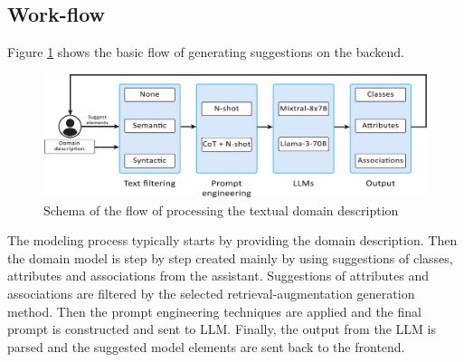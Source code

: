 \subsection{Work-flow}

Figure \ref{fig:work-flow} shows the basic flow of generating suggestions on the backend.

\begin{figure}[!h]
    \centering
    \includegraphics[scale=0.23]{img/work-flow.jpg}
    \caption{\centering Schema of the flow of processing the textual domain description}
    \label{fig:work-flow}
\end{figure}

The modeling process typically starts by providing the domain description. Then the domain model is step by step created mainly by using suggestions of classes, attributes and associations from the assistant. Suggestions of attributes and associations are filtered by the selected retrieval-augmentation generation method. Then the prompt engineering techniques are applied and the final prompt is constructed and sent to LLM. Finally, the output from the LLM is parsed and the suggested model elements are sent back to the frontend.